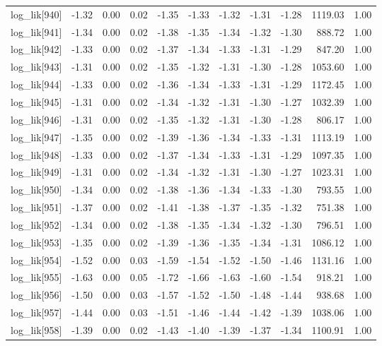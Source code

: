 \begin{table}[ht]
\begin{tabular}{rrrrrrrrrrr}
  log\_lik[940] & -1.32 & 0.00 & 0.02 & -1.35 & -1.33 & -1.32 & -1.31 & -1.28 & 1119.03 & 1.00 \\ 
  log\_lik[941] & -1.34 & 0.00 & 0.02 & -1.38 & -1.35 & -1.34 & -1.32 & -1.30 & 888.72 & 1.00 \\ 
  log\_lik[942] & -1.33 & 0.00 & 0.02 & -1.37 & -1.34 & -1.33 & -1.31 & -1.29 & 847.20 & 1.00 \\ 
  log\_lik[943] & -1.31 & 0.00 & 0.02 & -1.35 & -1.32 & -1.31 & -1.30 & -1.28 & 1053.60 & 1.00 \\ 
  log\_lik[944] & -1.33 & 0.00 & 0.02 & -1.36 & -1.34 & -1.33 & -1.31 & -1.29 & 1172.45 & 1.00 \\ 
  log\_lik[945] & -1.31 & 0.00 & 0.02 & -1.34 & -1.32 & -1.31 & -1.30 & -1.27 & 1032.39 & 1.00 \\ 
  log\_lik[946] & -1.31 & 0.00 & 0.02 & -1.35 & -1.32 & -1.31 & -1.30 & -1.28 & 806.17 & 1.00 \\ 
  log\_lik[947] & -1.35 & 0.00 & 0.02 & -1.39 & -1.36 & -1.34 & -1.33 & -1.31 & 1113.19 & 1.00 \\ 
  log\_lik[948] & -1.33 & 0.00 & 0.02 & -1.37 & -1.34 & -1.33 & -1.31 & -1.29 & 1097.35 & 1.00 \\ 
  log\_lik[949] & -1.31 & 0.00 & 0.02 & -1.34 & -1.32 & -1.31 & -1.30 & -1.27 & 1023.31 & 1.00 \\ 
  log\_lik[950] & -1.34 & 0.00 & 0.02 & -1.38 & -1.36 & -1.34 & -1.33 & -1.30 & 793.55 & 1.00 \\ 
  log\_lik[951] & -1.37 & 0.00 & 0.02 & -1.41 & -1.38 & -1.37 & -1.35 & -1.32 & 751.38 & 1.00 \\ 
  log\_lik[952] & -1.34 & 0.00 & 0.02 & -1.38 & -1.35 & -1.34 & -1.32 & -1.30 & 796.51 & 1.00 \\ 
  log\_lik[953] & -1.35 & 0.00 & 0.02 & -1.39 & -1.36 & -1.35 & -1.34 & -1.31 & 1086.12 & 1.00 \\ 
  log\_lik[954] & -1.52 & 0.00 & 0.03 & -1.59 & -1.54 & -1.52 & -1.50 & -1.46 & 1131.16 & 1.00 \\ 
  log\_lik[955] & -1.63 & 0.00 & 0.05 & -1.72 & -1.66 & -1.63 & -1.60 & -1.54 & 918.21 & 1.00 \\ 
  log\_lik[956] & -1.50 & 0.00 & 0.03 & -1.57 & -1.52 & -1.50 & -1.48 & -1.44 & 938.68 & 1.00 \\ 
  log\_lik[957] & -1.44 & 0.00 & 0.03 & -1.51 & -1.46 & -1.44 & -1.42 & -1.39 & 1038.06 & 1.00 \\ 
  log\_lik[958] & -1.39 & 0.00 & 0.02 & -1.43 & -1.40 & -1.39 & -1.37 & -1.34 & 1100.91 & 1.00 \\ 

\end{tabular}
\end{table}
